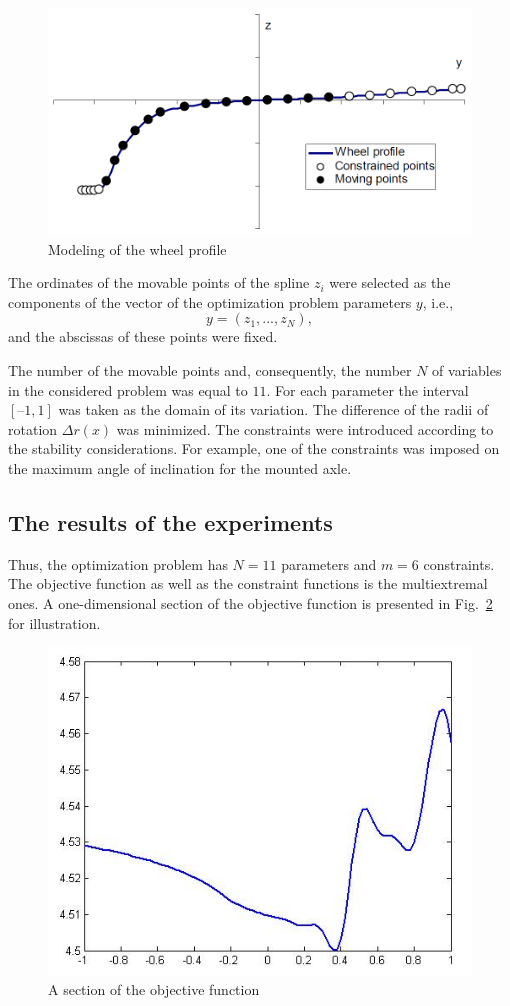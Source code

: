 \begin{figure}[t]
\includegraphics[width=0.7\linewidth]{figures/8_3.png}
\caption{Modeling of the wheel profile}
\label{8_fig_3}     
\end{figure}

The ordinates of the movable points of the spline $z_i$ were selected as the components of the vector of the optimization problem parameters $y$, i.e.,
\[
y=(z_1,...,z_N),
\]
and the abscissas of these points were fixed.

The number of the movable points and, consequently, the number $N$ of variables in the considered problem was equal to $11$. For each parameter   the interval $\left[–1, 1\right]$ was taken as the domain of its variation. The difference of the radii of rotation $\Delta r(x)$ was minimized. The constraints were introduced according to the stability considerations. For example, one of the constraints was imposed on the maximum angle of inclination for the mounted axle.

\subsection{The results of the experiments}

Thus, the optimization problem has $N=11$ parameters and $m=6$ constraints. The objective function as well as the constraint functions is the multiextremal ones. A one-dimensional section of the objective function is presented in Fig.~\ref{8_fig_4} for illustration.

\begin{figure}[t]
\includegraphics[width=0.7\linewidth]{figures/8_4.png}
\caption{A section of the objective function }
\label{8_fig_4}     
\end{figure}

